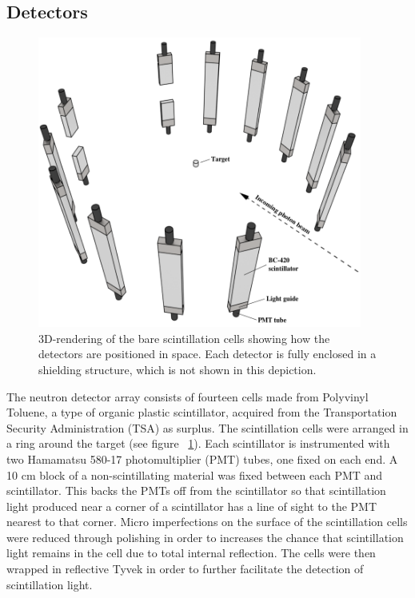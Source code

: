 \subsection{Detectors}
\label{section:Detectors}
\begin{figure}[h]
\centering
\includegraphics[width=0.95\textwidth]{Content/Methods/Detectors.png}
\caption{3D-rendering of the bare scintillation cells showing how the detectors are positioned in space.
Each detector is fully enclosed in a shielding structure, which is not shown in this depiction.}
\label{fig:DetGeom}
\end{figure}
The neutron detector array consists of fourteen cells made from Polyvinyl Toluene, a type of organic plastic scintillator, acquired from the Transportation Security Administration (TSA) as surplus.
The scintillation cells were arranged in a ring around the target (see figure ~\ref{fig:DetGeom}).
Each scintillator is instrumented with two Hamamatsu 580-17 photomultiplier (PMT) tubes, one fixed on each end.
A 10 cm block of a non-scintillating material was fixed between each PMT and scintillator.
This backs the PMTs off from the scintillator so that scintillation light produced near a corner of a scintillator has a line of sight to the PMT nearest to that corner.
Micro imperfections on the surface of the scintillation cells were reduced through polishing in order to increases the chance that scintillation light remains in the cell due to total internal reflection.
The cells were then wrapped in reflective Tyvek in order to further facilitate the detection of scintillation light.

